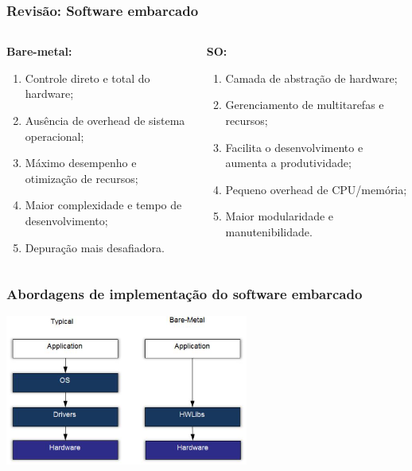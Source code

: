 \documentclass{beamer}
\begin{document}
\begin{frame}[fragile]
\frametitle{Revisão: Software embarcado}

\begin{columns}
    \begin{column}{0.5\textwidth}
        \textbf{Bare-metal:}
        \begin{enumerate}\small
            \item Controle direto e total do hardware;
            \item Ausência de overhead de sistema operacional;
            \item Máximo desempenho e otimização de recursos;
            \item Maior complexidade e tempo de desenvolvimento;
            \item Depuração mais desafiadora.
        \end{enumerate}
    \end{column}
    
    \begin{column}{0.5\textwidth}
        \textbf{SO:}
        \begin{enumerate}\small
            \item Camada de abstração de hardware;
            \item Gerenciamento de multitarefas e recursos;
            \item Facilita o desenvolvimento e aumenta a produtividade;
            \item Pequeno overhead de CPU/memória;
            \item Maior modularidade e manutenibilidade.
        \end{enumerate}
    \end{column}
\end{columns}

\end{frame}

\begin{frame}[fragile]
    \frametitle{Abordagens de implementação do software embarcado}

    \begin{center}
        \includegraphics[width=0.6\textwidth]{../figures/bare_metal_vs_os.png}
    \end{center}

\end{frame}
\end{document}
